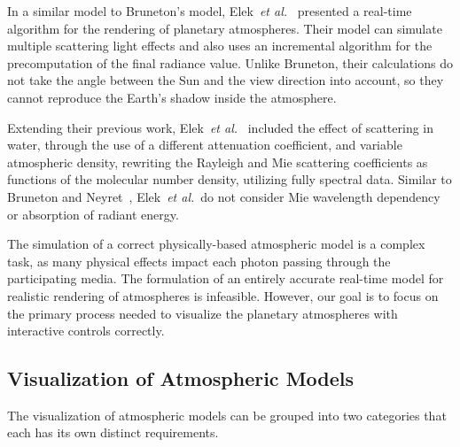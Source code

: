 \documentclass[journal]{vgtc}                %
\newcommand{\etal}{\emph{et al.}}
\newcommand{\review}[1]{{\color{blue}#1}}
\begin{document}

\review{In a similar model to Bruneton's model, Elek~\etal~\cite{Elek:2009} presented a real-time algorithm for the rendering of planetary atmospheres. Their model can simulate multiple scattering light effects and also uses an incremental algorithm for the precomputation of the final radiance value. Unlike Bruneton, their calculations do not take the angle between the Sun and the view direction into account, so they cannot reproduce the Earth's shadow inside the atmosphere.}

Extending their previous work, Elek~\etal~\cite{Elek:2010} included the effect of scattering in water, through the use of a different attenuation coefficient, and variable atmospheric density, rewriting the Rayleigh and Mie scattering coefficients as functions of the molecular number density, utilizing fully spectral data. \review{Similar to Bruneton and Neyret~\cite{BrunetonNeyret:2008}, Elek~\etal~do not consider Mie wavelength dependency or absorption of radiant energy.}


\review{The simulation of a correct physically-based atmospheric model is a complex task, as many physical effects \review{impact} each photon passing through the participating media. \review{ The formulation of} an entirely accurate real-time model for realistic rendering of atmospheres is infeasible. However, our goal is to focus on the primary process needed to visualize the planetary atmospheres with interactive controls correctly.}


\subsection{Visualization of Atmospheric Models}
The visualization of atmospheric models can be grouped into two categories that each \review{has its} own distinct requirements.
\end{document}
